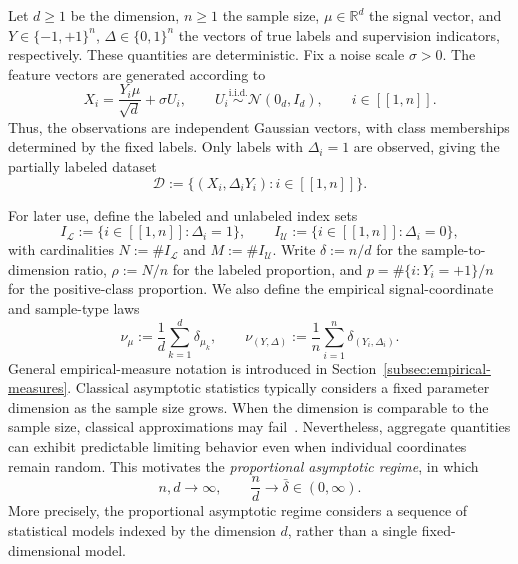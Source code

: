 \begin{definition}
\label{def:gaussian-mixture-model}
Let $d\ge1$ be the dimension, $n\ge1$ the sample size,
$\mu\in\mathbb R^d$ the signal vector, and
$Y\in\{-1,+1\}^n$, $\Delta\in\{0,1\}^n$
the vectors of true labels and supervision indicators,
respectively. These quantities are deterministic.
Fix a noise scale $\sigma>0$. The feature vectors are
generated according to
\begin{equation}
    X_i
    =
    \frac{Y_i\mu}{\sqrt d}+\sigma U_i,
    \qquad
    U_i\stackrel{\mathrm{i.i.d.}}{\sim}
    \mathcal N(0_d,I_d),
    \qquad i\in[\![1,n]\!].
    \label{eq:gaussian-mixture-model}
\end{equation}
Thus, the observations are independent Gaussian vectors,
with class memberships determined by the fixed labels.
Only labels with $\Delta_i=1$ are observed, giving the
partially labeled dataset
\[
    \mathcal D
    :=
    \{(X_i,\Delta_iY_i):i\in[\![1,n]\!]\}.
\]
\end{definition}
For later use, define the labeled and unlabeled index sets
\[
    I_{\mathcal L}
    :=
    \{i\in[\![1,n]\!]:\Delta_i=1\},
    \qquad
    I_{\mathcal U}
    :=
    \{i\in[\![1,n]\!]:\Delta_i=0\},
\]
with cardinalities
$N:=\#I_{\mathcal L}$ and $M:=\#I_{\mathcal U}$.
Write $\delta := n / d$ for the sample-to-dimension ratio, $\rho := N/n$ for the labeled proportion,
and $p=\#\{i: Y_i=+1\}/n$ for the positive-class proportion.
We also define the empirical signal-coordinate and
sample-type laws
\begin{equation}
    \nu_\mu
    :=
    \frac1d\sum_{k=1}^d\delta_{\mu_k},
    \qquad
    \nu_{(Y,\Delta)}
    :=
    \frac1n\sum_{i=1}^n\delta_{(Y_i,\Delta_i)}.
    \label{eq:empirical-environment-laws}
\end{equation}
General empirical-measure notation is introduced in
Section~\ref{subsec:empirical-measures}.
Classical asymptotic statistics typically considers a fixed
parameter dimension as the sample size grows.
When the dimension is comparable to the sample size,
classical approximations may fail~\cite{sur2019modern}.
Nevertheless, aggregate quantities can exhibit predictable
limiting behavior even when individual coordinates remain random.
This motivates the \emph{proportional asymptotic regime}, in which
\[
    n,d\longrightarrow\infty,
    \qquad
    \frac nd\longrightarrow\bar\delta\in(0,\infty).
\]
More precisely, the proportional asymptotic regime considers
a sequence of statistical models indexed by the dimension $d$,
rather than a single fixed-dimensional model.
